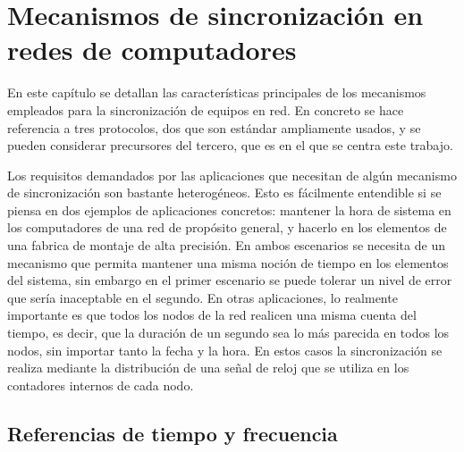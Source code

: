 \chapter{Mecanismos de sincronización en redes de computadores}

En este capítulo se detallan las características principales de los mecanismos 
empleados para la sincronización de equipos en red. En concreto se hace 
referencia a tres protocolos, dos que son estándar ampliamente usados, y se 
pueden considerar precursores del tercero, que es en el que se centra este 
trabajo.

Los requisitos demandados por las aplicaciones que necesitan de algún mecanismo 
de sincronización son bastante heterogéneos. Esto es fácilmente entendible si 
se piensa en dos ejemplos de aplicaciones concretos: mantener la hora de 
sistema en los computadores de una red de propósito general, y hacerlo en los 
elementos de una fabrica de montaje de alta precisión.
En ambos escenarios se necesita de un mecanismo que permita mantener una misma 
noción de tiempo en los elementos del sistema, sin embargo en el primer 
escenario se puede tolerar un nivel de error que sería inaceptable en el 
segundo.
En otras aplicaciones, lo realmente importante es que todos los nodos de la red 
realicen una misma cuenta del tiempo, es decir, que la duración de un segundo 
sea lo más parecida en todos los nodos, sin importar tanto la fecha y la hora. 
En estos casos la sincronización se realiza mediante la distribución de una 
señal de reloj que se utiliza en los contadores internos de cada nodo. 

\section{Referencias de tiempo y frecuencia}




